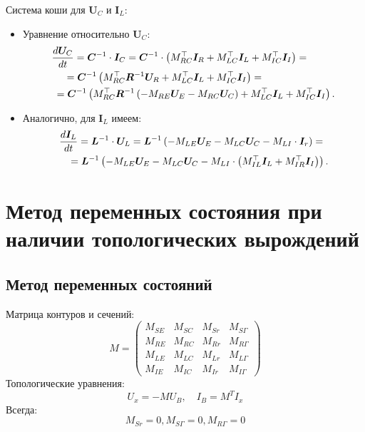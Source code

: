 	Система коши для $\bm{U}_C$ и $\bm{I}_L$:
	\begin{itemize}
		\item Уравнение относительно $\bm{U}_C$:
		\begin{equation}
			\begin{aligned}
				\frac{d \bm{U}_C}{dt} &= \bm{C}^{-1} \cdot \bm{I}_C = \bm{C}^{-1} \cdot \left( M_{RC}^\top \bm{I}_R + M_{LC}^\top \bm{I}_L + M_{IC}^\top \bm{I}_I \right) =\\
				&\hspace{-1em}= \bm{C}^{-1} \left( M_{RC}^\top \bm{R}^{-1} \bm{U}_R + M_{LC}^\top \bm{I}_L + M_{IC}^\top \bm{I}_I \right) =\\
				&\hspace{-2em}= \bm{C}^{-1} \left( M_{RC}^\top \bm{R}^{-1} \left( -M_{RE} \bm{U}_E - M_{RC} \bm{U}_C \right) + M_{LC}^\top \bm{I}_L + M_{IC}^\top \bm{I}_I \right).
			\end{aligned}
		\end{equation}
		\item Аналогично, для $\bm{I}_L$ имеем:
		\begin{equation}
			\begin{aligned}
				\frac{d \bm{I}_L}{dt} &= \bm{L}^{-1} \cdot \bm{U}_L = \bm{L}^{-1} \left( -M_{LE} \bm{U}_E - M_{LC} \bm{U}_C - M_{LI} \cdot \bm{I}_r \right) =\\
				&\hspace{-1em}= \bm{L}^{-1} \left( -M_{LE} \bm{U}_E - M_{LC} \bm{U}_C - M_{LI} \cdot \left( M_{IL}^\top \bm{I}_L + M_{IR}^\top \bm{I}_I \right) \right).
			\end{aligned}
		\end{equation}
	\end{itemize}
	
	\newpage
	
	\section{Метод переменных состояния при наличии топологических вырождений}
	\subsection{Метод переменных состояний}
	
	Матрица контуров и сечений:
	\begin{equation}
		M = \begin{pmatrix}
			M_{SE} & M_{SC} & M_{Sr} & M_{S\Gamma} \\
			M_{RE} & M_{RC} & M_{Rr} & M_{R\Gamma} \\
			M_{LE} & M_{LC} & M_{Lr} & M_{L\Gamma} \\
			M_{IE} & M_{IC} & M_{Ir} & M_{I\Gamma}
		\end{pmatrix}
	\end{equation}
	Топологические уравнения:
	\begin{equation}
		U_x = -M U_B, \quad I_B = M^T I _x
	\end{equation}
	Всегда:
	\begin{equation}
		M_{Sr} = 0, M_{S\Gamma} = 0, M_{R\Gamma} = 0
	\end{equation}
	
